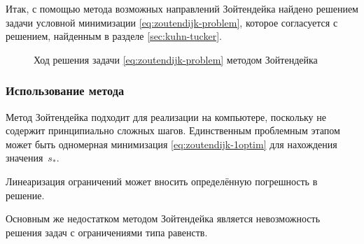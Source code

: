 Итак, с помощью метода возможных направлений Зойтендейка найдено
решением задачи условной минимизации \eqref{eq:zoutendijk-problem},
которое согласуется с решением, найденным в разделе
\ref{sec:kuhn-tucker}.

\begin{figure}[!h]
  \centering
  \caption[Метод Зойтендейка]{Ход решения задачи
    \eqref{eq:zoutendijk-problem} методом Зойтендейка}
  \label{fig:zoutendijk}
\end{figure}

\subsubsection{Использование метода}

Метод Зойтендейка подходит для реализации на компьютере, поскольку не
содержит принципиально сложных шагов. Единственным проблемным этапом
может быть одномерная минимизация \eqref{eq:zoutendijk-1optim} для
нахождения значения $s_*$.

Линеаризация ограничений может вносить определённую погрешность в
решение.

Основным же недостатком методом Зойтендейка является невозможность
решения задач с ограничениями типа равенств.
